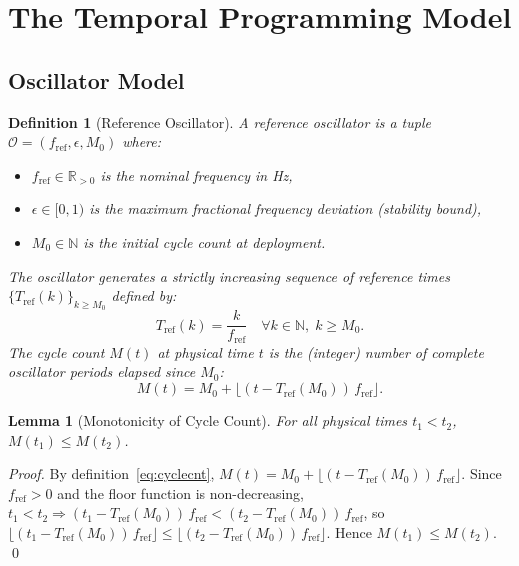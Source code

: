 \documentclass[twocolumn,10pt]{article}
\newtheorem{lemma}[theorem]{Lemma}
\newtheorem{definition}[theorem]{Definition}
\newcommand{\Tref}{T_{\mathrm{ref}}}
\newcommand{\Mcyc}{M}               %
\newcommand{\fref}{f_{\mathrm{ref}}}
\begin{document}
\section{The Temporal Programming Model}
\label{sec:model}

\subsection{Oscillator Model}

\begin{definition}[Reference Oscillator]
\label{def:oscillator}
A \emph{reference oscillator} is a tuple $\mathcal{O} =
(\fref, \epsilon, M_0)$ where:
\begin{itemize}[leftmargin=1.5em,topsep=2pt,itemsep=1pt]
  \item $\fref \in \mathbb{R}_{>0}$ is the nominal frequency in Hz,
  \item $\epsilon \in [0,1)$ is the maximum fractional frequency
    deviation (stability bound),
  \item $M_0 \in \mathbb{N}$ is the initial cycle count at deployment.
\end{itemize}
The oscillator generates a strictly increasing sequence of
\emph{reference times}
$\{\Tref(k)\}_{k \geq M_0}$ defined by:
\begin{equation}
  \Tref(k) = \frac{k}{\fref}
  \quad \forall k \in \mathbb{N},\; k \geq M_0.
  \label{eq:tref}
\end{equation}
The \emph{cycle count} $\Mcyc(t)$ at physical time $t$ is the
(integer) number of complete oscillator periods elapsed since $M_0$:
\begin{equation}
  \Mcyc(t) = M_0 + \lfloor (t - \Tref(M_0))\,\fref \rfloor.
  \label{eq:cyclecnt}
\end{equation}
\end{definition}

\begin{lemma}[Monotonicity of Cycle Count]
\label{lem:mono}
For all physical times $t_1 < t_2$, $\Mcyc(t_1) \leq \Mcyc(t_2)$.
\end{lemma}
\begin{proof}
By definition~\eqref{eq:cyclecnt},
$\Mcyc(t) = M_0 + \lfloor (t - \Tref(M_0))\,\fref \rfloor$.
Since $\fref > 0$ and the floor function is non-decreasing,
$t_1 < t_2 \Rightarrow (t_1 - \Tref(M_0))\,\fref <
(t_2 - \Tref(M_0))\,\fref$, so
$\lfloor (t_1 - \Tref(M_0))\,\fref \rfloor \leq
\lfloor (t_2 - \Tref(M_0))\,\fref \rfloor$.
Hence $\Mcyc(t_1) \leq \Mcyc(t_2)$. \qed
\end{proof}
\end{document}
